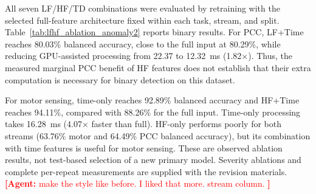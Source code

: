 \documentclass[letterpaper,journal]{IEEEtran}
\newcommand{\agent}[1]{%
    \textcolor{red}{\textbf{[Agent:} #1\textbf{]}}%
}
\begin{document}
All seven LF/HF/TD combinations were evaluated by retraining with the selected full-feature architecture fixed within each task, stream, and split. Table~\ref{tab:lfhf_ablation_anomaly2} reports binary results. For PCC, LF+Time reaches 80.03\% balanced accuracy, close to the full input at 80.29\%, while reducing GPU-assisted processing from 22.37 to 12.32~ms (1.82$\times$). Thus, the measured marginal PCC benefit of HF features does not establish that their extra computation is necessary for binary detection on this dataset.

For motor sensing, time-only reaches 92.89\% balanced accuracy and HF+Time reaches 94.11\%, compared with 88.26\% for the full input. Time-only processing takes 16.28~ms (4.07$\times$ faster than full). HF-only performs poorly for both streams (63.76\% motor and 64.49\% PCC balanced accuracy), but its combination with time features is useful for motor sensing. These are observed ablation results, not test-based selection of a new primary model. Severity ablations and complete per-repeat measurements are supplied with the revision materials.
\agent{make the style like before. I liked that more. stream column. }
\end{document}
